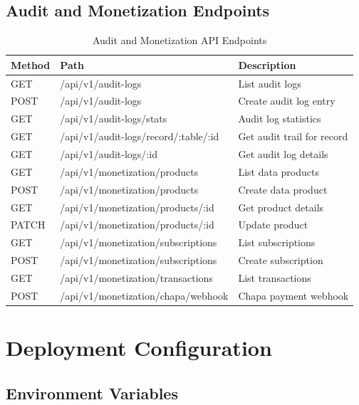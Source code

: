 \section{Audit and Monetization Endpoints}

\begin{longtable}{lll}
\caption{Audit and Monetization API Endpoints}
\label{tab:audit-api} \\
\toprule
\textbf{Method} & \textbf{Path} & \textbf{Description} \\
\midrule
\endhead
\midrule
\endfoot
\bottomrule
\endlastfoot
GET & /api/v1/audit-logs & List audit logs \\
POST & /api/v1/audit-logs & Create audit log entry \\
GET & /api/v1/audit-logs/stats & Audit log statistics \\
GET & /api/v1/audit-logs/record/:table/:id & Get audit trail for record \\
GET & /api/v1/audit-logs/:id & Get audit log details \\
GET & /api/v1/monetization/products & List data products \\
POST & /api/v1/monetization/products & Create data product \\
GET & /api/v1/monetization/products/:id & Get product details \\
PATCH & /api/v1/monetization/products/:id & Update product \\
GET & /api/v1/monetization/subscriptions & List subscriptions \\
POST & /api/v1/monetization/subscriptions & Create subscription \\
GET & /api/v1/monetization/transactions & List transactions \\
POST & /api/v1/monetization/chapa/webhook & Chapa payment webhook \\
\end{longtable}


\chapter{Deployment Configuration}

\section{Environment Variables}

